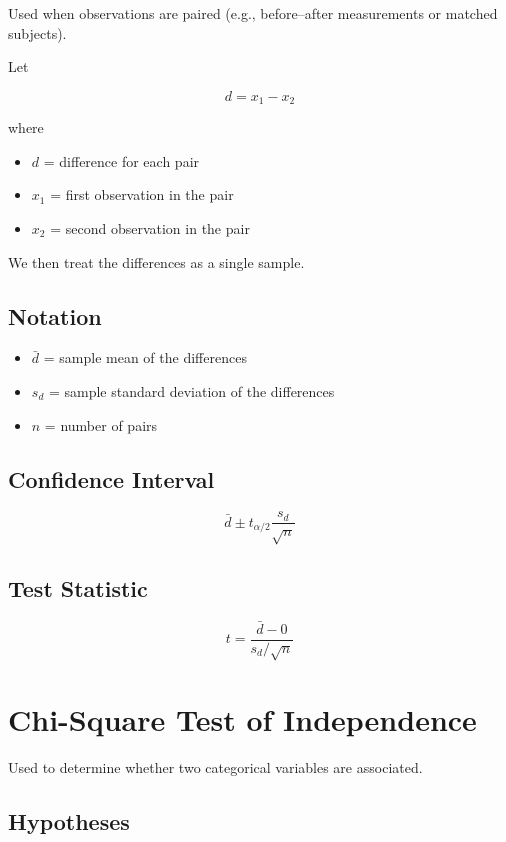 \documentclass[11pt]{article}
\begin{document}
Used when observations are paired (e.g., before–after measurements or matched subjects).

Let

\[
d = x_1 - x_2
\]

where

\begin{itemize}
\item $d$ = difference for each pair
\item $x_1$ = first observation in the pair
\item $x_2$ = second observation in the pair
\end{itemize}

We then treat the differences as a single sample.

\subsection*{Notation}

\begin{itemize}
\item $\bar d$ = sample mean of the differences
\item $s_d$ = sample standard deviation of the differences
\item $n$ = number of pairs
\end{itemize}

\subsection*{Confidence Interval}

\[
\bar d \pm t_{\alpha/2}\frac{s_d}{\sqrt{n}}
\]

\subsection*{Test Statistic}

\[
t =
\frac{\bar d - 0}{s_d/\sqrt{n}}
\]

\section{Chi-Square Test of Independence}

Used to determine whether two categorical variables are associated.

\subsection*{Hypotheses}
\end{document}
